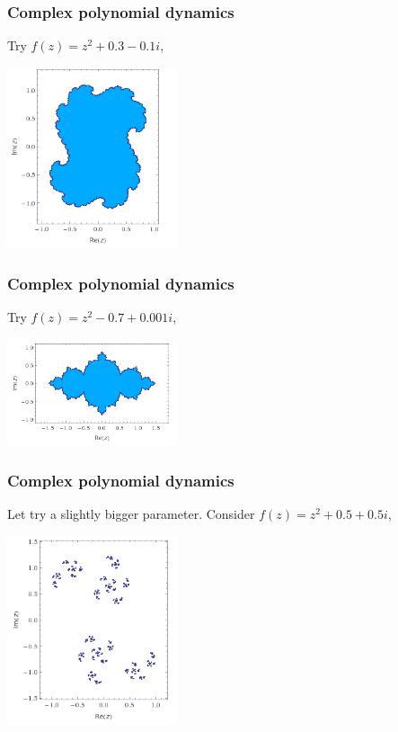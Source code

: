 \documentclass{beamer} %
\theoremstyle{definition} %
\begin{document}
\begin{frame}\frametitle{Complex polynomial dynamics}
    Try $f(z) = z^2+0.3-0.1i$,\\
    \begin{center}
        \includegraphics[width=50mm]{img/julia03-01-filled.png}
    \end{center}
\end{frame}

\begin{frame}\frametitle{Complex polynomial dynamics}
    Try $f(z) = z^2-0.7+0.001i$,\\
    \begin{center}
        \includegraphics[width=50mm]{img/julia-07001-filled.png}
    \end{center}
\end{frame}

\begin{frame}\frametitle{Complex polynomial dynamics}
    Let try a slightly bigger parameter. Consider $f(z) = z^2+0.5+0.5i$,
    \begin{center}
        \includegraphics[width=50mm]{img/julia0505.png}
    \end{center}
\end{frame}
\end{document}
